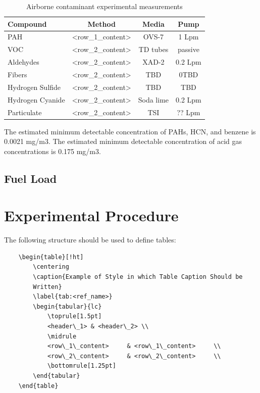 \documentclass[12pt,oneside]{book}
\begin{document}
\begin{table}[!ht]
	\centering
	\caption{Airborne contaminant experimental measurements}
	\begin{tabular}{lccc}
		\toprule[1.5pt]
		Compound & Method & Media & Pump \\
		\midrule
		PAH   				& <row\_1\_content>     & OVS-7     & 1 Lpm     \\
		VOC    				& <row\_2\_content>     & TD tubes 	& passive    \\
		Aldehydes   	 	& <row\_2\_content>     & XAD-2    	& 0.2 Lpm    \\
		Fibers    			& <row\_2\_content>     & TBD    	& 0TBD   \\
		Hydrogen Sulfide  	& <row\_2\_content>     & TBD    	& TBD    \\
		Hydrogen Cyanide   	& <row\_2\_content>     & Soda lime	& 0.2 Lpm    \\
		Particulate   		& <row\_2\_content>     & TSI    	& ?? Lpm    \\
		\bottomrule[1.25pt]
	\end{tabular}
\end{table}
The estimated minimum detectable concentration of PAHs, HCN, and benzene  is  0.0021 mg/m3.
The estimated minimum detectable concentration of acid gas concentrations is 0.175 mg/m3.


\section{Fuel Load}

\chapter{Experimental Procedure}
\label{chap:exp_procedure}

The following structure should be used to define tables:
\begin{verbatim}
	\begin{table}[!ht]
	    \centering
	    \caption{Example of Style in which Table Caption Should be 
        Written}
	    \label{tab:<ref_name>}
	    \begin{tabular}{lc}
	        \toprule[1.5pt]
	        <header\_1> & <header\_2> \\
	        \midrule
	        <row\_1\_content>     & <row\_1\_content>     \\
	        <row\_2\_content>     & <row\_2\_content>     \\
	        \bottomrule[1.25pt]
	    \end{tabular}
	\end{table}
\end{verbatim}
\end{document}
